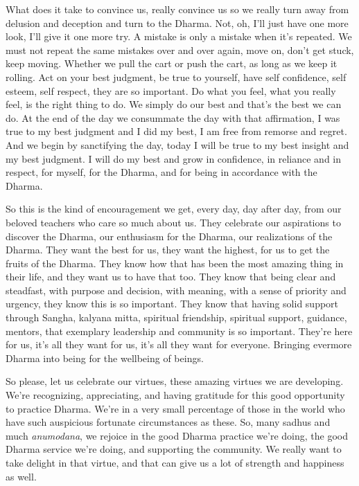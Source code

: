\documentclass[12pt,openany]{book}
\begin{document}
What does it take to convince us, really convince us so we really turn away from delusion and deception and turn to the Dhar\-ma. Not, oh, I'll just have one more look, I'll give it one more try. A mistake is only a mistake when it’s repeated. We must not repeat the same mistakes over and over again, move on, don't get stuck, keep moving. Whether we pull the cart or push the cart, as long as we keep it rolling. Act on your best judgment, be true to yourself, have self confidence, self esteem, self respect, they are so important. Do what you feel, what you really feel, is the right thing to do. We simply do our best and that's the best we can do. At the end of the day we consummate the day with that affirmation, I was true to my best judgment and I did my best, I am free from remorse and regret. And we begin by sanctifying the day, today I will be true to my best insight and my best judgment. I will do my best and grow in confidence, in reliance and in respect, for myself, for the Dhar\-ma, and for being in accordance with the Dhar\-ma. 

So this is the kind of encouragement we get, every day, day after day, from our beloved teachers who care so much about us. They celebrate our aspirations to discover the Dhar\-ma, our enthusiasm for the Dhar\-ma, our realizations of the Dhar\-ma. They want the best for us, they want the highest, for us to get the fruits of the Dhar\-ma. They know how that has been the most amazing thing in their life, and they want us to have that too. They know that being clear and steadfast, with purpose and decision, with meaning, with a sense of priority and urgency, they know this is so important. They know that having solid support through Sangha, kalyana mitta, spiritual friendship, spiritual support, guidance, mentors, that exemplary leadership and community is so important. They're here for us, it's all they want for us, it's all they want for everyone. Bringing evermore Dhar\-ma into being for the wellbeing of beings.

So please, let us celebrate our virtues, these amazing virtues we are developing. We're recognizing, appreciating, and having gratitude for this good opportunity to practice Dhar\-ma. We’re in a very small percentage of those in the world who have such auspicious fortunate circumstances as these. So, many sadhus and much \textit{a\-nu\-mo\-da\-na}, we rejoice in the good Dhar\-ma practice we're doing, the good Dhar\-ma service we’re doing, and supporting the community. We really want to take delight in that virtue, and that can give us a lot of strength and happiness as well.
\end{document}
